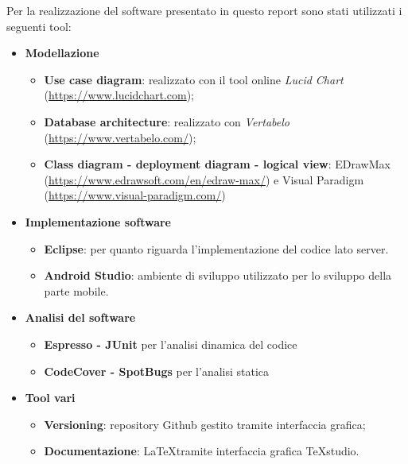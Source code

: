 Per la realizzazione del software presentato in questo report sono stati utilizzati i seguenti tool:
\begin{itemize}
	\item \textbf{Modellazione}
	\begin{itemize}
		\item \textbf{Use case diagram}: realizzato con il tool online \textit{Lucid Chart} (\href{https://www.lucidchart.com}{https://www.lucidchart.com});
		\item \textbf{Database architecture}: realizzato con \textit{Vertabelo} (\href{https://www.vertabelo.com/}{https://www.vertabelo.com/});
		\item \textbf{Class diagram - deployment diagram - logical view}: EDrawMax (\href{https://www.edrawsoft.com/en/edraw-max/}{https://www.edrawsoft.com/en/edraw-max/}) e Visual Paradigm (\href{https://www.visual-paradigm.com/}{https://www.visual-paradigm.com/})
	\end{itemize}
	\item \textbf{Implementazione software}
	\begin{itemize}
		\item \textbf{Eclipse}: per quanto riguarda l'implementazione del codice lato server.
		\item \textbf{Android Studio}: ambiente di sviluppo utilizzato per lo sviluppo della parte mobile.
	\end{itemize}
	
	\item \textbf{Analisi del software}
	\begin{itemize}
		\item \textbf{Espresso - JUnit} per l'analisi dinamica del codice
		\item \textbf{CodeCover - SpotBugs} per l'analisi statica
	\end{itemize}
	\item \textbf{Tool vari}
	\begin{itemize}
		\item \textbf{Versioning}: repository Github gestito tramite interfaccia grafica;
		\item \textbf{Documentazione}: \LaTeX  tramite interfaccia grafica TeXstudio.
	\end{itemize}
\end{itemize}